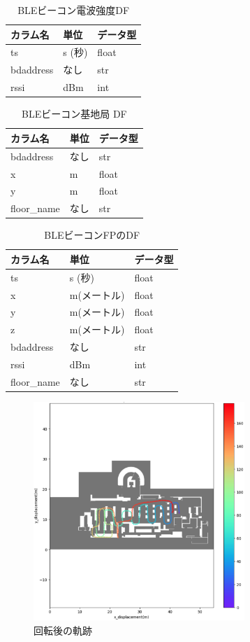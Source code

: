 \begin{table}[h]
	\centering
	\begin{tabular}{lll}
		\toprule
		カラム名      & 単位    & データ型  \\
		\midrule
		ts        & s (秒) & float \\
		bdaddress & なし    & str   \\
		rssi      & dBm   & int   \\
		\bottomrule
	\end{tabular}
	\caption{BLEビーコン電波強度DF}
\end{table}


\begin{table}[h]
	\centering
	\begin{tabular}{lll}
		\toprule
		カラム名        & 単位 & データ型  \\
		\midrule
		bdaddress   & なし & str   \\
		x           & m  & float \\
		y           & m  & float \\
		floor\_name & なし & str   \\
		\bottomrule
	\end{tabular}
	\caption{BLEビーコン基地局 DF}
\end{table}


\begin{table}[h]
	\centering
	\begin{tabular}{lll}
		\toprule
		カラム名        & 単位      & データ型  \\
		\midrule
		ts          & s (秒)   & float \\
		x           & m(メートル) & float \\
		y           & m(メートル) & float \\
		z           & m(メートル) & float \\
		bdaddress   & なし      & str   \\
		rssi        & dBm     & int   \\
		floor\_name & なし      & str   \\
		\bottomrule
	\end{tabular}
	\caption{BLEビーコンFPのDF}
\end{table}


\begin{figure}[h]
	\centering
	\includegraphics[width=80mm]{image/fingerprint-rotate.jpg}
	\caption{回転後の軌跡}    \label{fig:fingerprint-rotate}
\end{figure}


